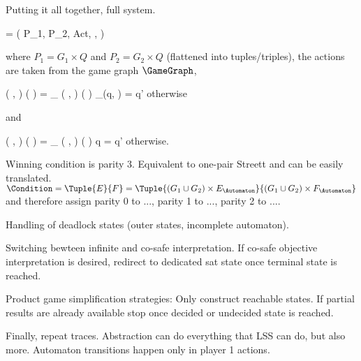 Putting it all together, full system.

\startformula
    \ProductGame = ( P_1, P_2, Act, \Transition, \Condition ) \EndComma
\stopformula

where $P_1 = G_1 \times Q$ and $P_2 = G_2 \times Q$ (flattened into tuples/triples), the actions are taken from the game graph $\GameGraph$,

\startformula
    \Transition
        \Big( ,  \Big)
        \Big(  \Big)
    = \startmathcases
        \NC \Transition_\GameGraph
        \Big( ,  \Big)
        \Big(  \Big)
        \MC \Transition_\Automaton(q, ) = q'
        \NR
        \NC otherwise
        \NR
    \stopmathcases
\stopformula

and

\startformula
    \Transition
        \Big( ,  \Big)
        \Big(  \Big)
    = \startmathcases
        \NC \Transition_\GameGraph
        \Big( ,  \Big)
        \Big(  \Big)
        \MC q = q'
        \NR
        \NC otherwise.
        \NR
    \stopmathcases
\stopformula

Winning condition is parity 3.
Equivalent to one-pair Streett and can be easily translated.
$\Condition = \Tuple{E}{F} = \Tuple{(G_1 \cup G_2) \times E_\Automaton}{(G_1 \cup G_2) \times F_\Automaton}$ and therefore assign parity 0 to ..., parity 1 to ..., parity 2 to ....

Handling of deadlock states (outer states, incomplete automaton).

Switching bewteen infinite and co-safe interpretation.
If co-safe objective interpretation is desired, redirect to dedicated sat state once terminal state is reached.

Product game simplification strategies:
Only construct reachable states.
If partial results are already available stop once decided or undecided state is reached.

Finally, repeat traces.
Abstraction can do everything that LSS can do, but also more.
Automaton transitions happen only in player 1 actions.

